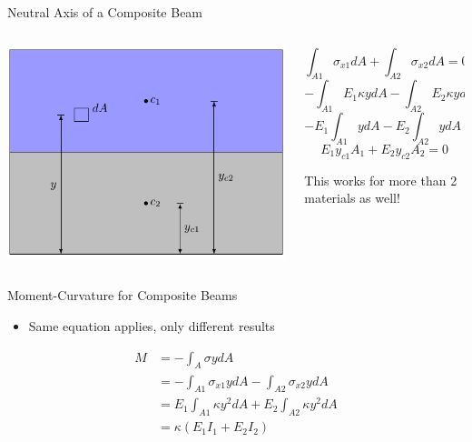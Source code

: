 \documentclass[10pt, svgnames]{beamer}
\begin{document}
\begin{frame}[label={sec:org483592b}]{Neutral Axis of a Composite Beam}
\begin{columns}
\begin{column}{0.5\columnwidth}
\begin{center}
\includegraphics[width=.9\linewidth]{./pictures/na-composite.pdf}
\end{center}
\end{column}

\begin{column}{0.5\columnwidth}
\[\int_{A1} \sigma_{x1} dA + \int_{A2} \sigma_{x2} dA = 0\]
\[- \int_{A1} E_1 \kappa y dA - \int_{A2} E_2 \kappa y dA = 0\]
\[- E_1 \int_{A1} y dA - E_2 \int_{A2} y dA = 0\]
\[E_1 y_{c1} A_1 + E_2 y_{c2} A_2 = 0\]

This works for more than 2 materials as well!
\end{column}
\end{columns}
\end{frame}

\begin{frame}[label={sec:org55c175b}]{Moment-Curvature for Composite Beams}
\begin{itemize}
\item Same equation applies, only different results
\end{itemize}

\begin{align*}
  M &= - \int_A \sigma y dA \\
    &= -\int_{A1} \sigma_{x1} y dA - \int_{A2} \sigma_{x2} y dA \\
    &= E_1 \int_{A1} \kappa y^2 dA + E_2 \int_{A2} \kappa y^2 dA \\
    &= \kappa \left( E_1 I_1 + E_2 I_2 \right)
\end{align*}
\end{frame}
\end{document}
